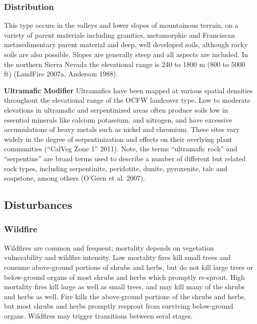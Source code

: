 \subsubsection*{Distribution}
This type occurs in the valleys and lower slopes of mountainous terrain, on a variety of parent materials including granitics, metamorphic and Franciscan metasedimentary parent material and deep, well developed soils, although rocky soils are also possible. Slopes are generally steep and all aspects are included. In the northern Sierra Nevada the elevational range is 240 to 1800 m (800 to 5000 ft) (LandFire 2007a, Anderson 1988).

\begin{adjustwidth}{2cm}{}

\textbf{Ultramafic Modifier} Ultramafics have been mapped at various spatial densities throughout the elevational range of the OCFW landcover type. Low to moderate elevations in ultramafic and serpentinized areas often produce soils low in essential minerals like calcium potassium, and nitrogen, and have excessive accumulations of heavy metals such as nickel and chromium. These sites vary widely in the degree of serpentinization and effects on their overlying plant communities (``CalVeg Zone 1'' 2011). Note, the terms ``ultramafic rock'' and ``serpentine'' are broad terms used to describe a number of different but related rock types, including serpentinite, peridotite, dunite, pyroxenite, talc and soapstone, among others (O'Geen et al. 2007).


\end{adjustwidth}

\subsection*{Disturbances}

\subsubsection*{Wildfire}
Wildfires are common and frequent; mortality depends on vegetation vulnerability and wildfire intensity. Low mortality fires kill small trees and consume above-ground portions of shrubs and herbs, but do not kill large trees or below-ground organs of most shrubs and herbs which promptly re-sprout. High mortality fires kill large as well as small trees, and may kill many of the shrubs and herbs as well. Fire kills the above-ground portions of the shrubs and herbs, but most shrubs and herbs promptly resprout from surviving below-ground organs. Wildfires may trigger transitions between seral stages.


